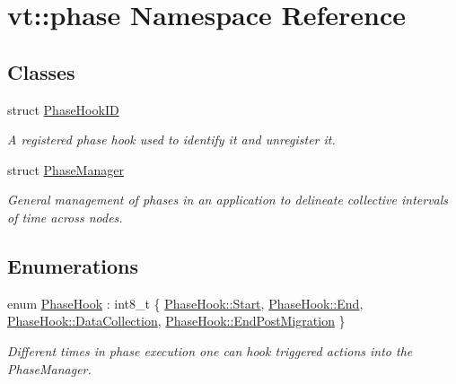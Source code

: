 \hypertarget{namespacevt_1_1phase}{}\section{vt\+:\+:phase Namespace Reference}
\label{namespacevt_1_1phase}
\subsection*{Classes}
\begin{DoxyCompactItemize}
\item 
struct \hyperlink{structvt_1_1phase_1_1_phase_hook_i_d}{Phase\+Hook\+ID}
\begin{DoxyCompactList}\small\item\em A registered phase hook used to identify it and unregister it. \end{DoxyCompactList}\item 
struct \hyperlink{structvt_1_1phase_1_1_phase_manager}{Phase\+Manager}
\begin{DoxyCompactList}\small\item\em General management of phases in an application to delineate collective intervals of time across nodes. \end{DoxyCompactList}\end{DoxyCompactItemize}
\subsection*{Enumerations}
\begin{DoxyCompactItemize}
\item 
enum \hyperlink{namespacevt_1_1phase_aec9a63fdd99680d7a7fe99d321193811}{Phase\+Hook} \+: int8\+\_\+t \{ \hyperlink{namespacevt_1_1phase_aec9a63fdd99680d7a7fe99d321193811aa6122a65eaa676f700ae68d393054a37}{Phase\+Hook\+::\+Start}, 
\hyperlink{namespacevt_1_1phase_aec9a63fdd99680d7a7fe99d321193811a87557f11575c0ad78e4e28abedc13b6e}{Phase\+Hook\+::\+End}, 
\hyperlink{namespacevt_1_1phase_aec9a63fdd99680d7a7fe99d321193811ae9b52b42e3fb150bbdd851e4ad7bfa4c}{Phase\+Hook\+::\+Data\+Collection}, 
\hyperlink{namespacevt_1_1phase_aec9a63fdd99680d7a7fe99d321193811a92bbcee517f28808f9795872094c0f08}{Phase\+Hook\+::\+End\+Post\+Migration}
 \}\begin{DoxyCompactList}\small\item\em Different times in phase execution one can hook triggered actions into the {\ttfamily Phase\+Manager}. \end{DoxyCompactList}
\end{DoxyCompactItemize}


